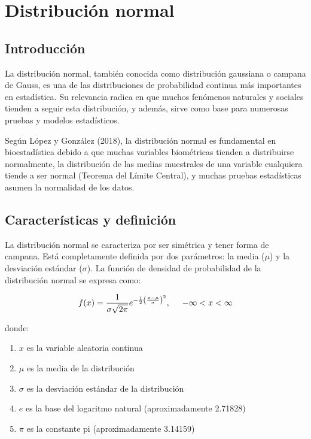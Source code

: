 \documentclass[
  spanish,
  letterpaper,
]{book}
\begin{document}

\chapter{Distribución normal}\label{distribuciuxf3n-normal-1}

\section{Introducción}\label{introducciuxf3n-2}

La distribución normal, también conocida como distribución gaussiana o
campana de Gauss, es una de las distribuciones de probabilidad continua
más importantes en estadística. Su relevancia radica en que muchos
fenómenos naturales y sociales tienden a seguir esta distribución, y
además, sirve como base para numerosas pruebas y modelos estadísticos.

Según López y González (2018), la distribución normal es fundamental en
bioestadística debido a que muchas variables biométricas tienden a
distribuirse normalmente, la distribución de las medias muestrales de
una variable cualquiera tiende a ser normal (Teorema del Límite
Central), y muchas pruebas estadísticas asumen la normalidad de los
datos.

\section{Características y
definición}\label{caracteruxedsticas-y-definiciuxf3n-2}

La distribución normal se caracteriza por ser simétrica y tener forma de
campana. Está completamente definida por dos parámetros: la media
(\(\mu\)) y la desviación estándar (\(\sigma\)). La función de densidad
de probabilidad de la distribución normal se expresa como:

\[\Large f(x) = \frac{1}{\sigma \sqrt{2\pi}} e^{-\frac{1}{2} \left(\frac{x - \mu}{\sigma}\right)^2}, \quad -\infty < x < \infty  \]

donde:

\begin{enumerate}
\def\labelenumi{\arabic{enumi}.}
\item
  \(x\) es la variable aleatoria continua
\item
  \(\mu\) es la media de la distribución
\item
  \(\sigma\) es la desviación estándar de la distribución
\item
  \(e\) es la base del logaritmo natural (aproximadamente 2.71828)
\item
  \(\pi\) es la constante pi (aproximadamente 3.14159)
\end{enumerate}
\end{document}

